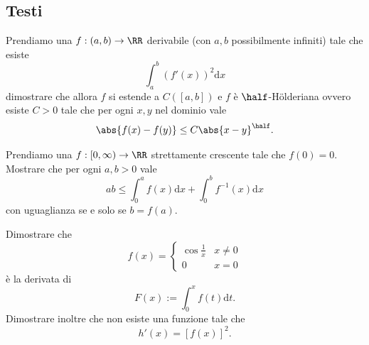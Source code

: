\documentclass[11pt]{scrartcl}
\newcommand{\dif}{\text{d}}
\begin{document}
	\subsection{Testi}
	\begin{problem}[Problema 1]
		Prendiamo una $f:(a,b)\to\RR$ derivabile (con $a,b$ possibilmente infiniti) tale che esiste
		$$\int_a^b \left(f'(x)\right)^2\dif x$$
		dimostrare che allora $f$ si estende a $C(\left[a,b\right])$ e $f$ è $\half$-H\"olderiana ovvero esiste $C>0$ tale che per ogni $x,y$ nel dominio vale
		$$\abs{f(x)-f(y)}\le C\abs{x-y}^\half.$$
	\end{problem}
	\begin{problem}[Problema 2]
		Prendiamo una $f:[0,\infty)\to\RR$ strettamente crescente tale che $f(0)=0$. Mostrare che per ogni $a,b>0$ vale
		$$ab\le \int_0^af(x)\dif x+\int_0^b f^{-1}(x)\dif x$$
		con uguaglianza se e solo se $b=f(a)$.
	\end{problem}
	\begin{problem}[Problema 3]
		Dimostrare che 
		$$f(x)=
		\begin{cases}
			\cos\frac{1}{x} & x\ne 0 \\
			0 & x=0
		\end{cases}
		$$
		è la derivata di 
		$$F(x):=\int_0^x f(t)\dif t.$$
		Dimostrare inoltre che non esiste una funzione tale che
		$$h'(x)=\left[f(x)\right]^2.$$
	\end{problem}
	\newpage
	
\end{document}
